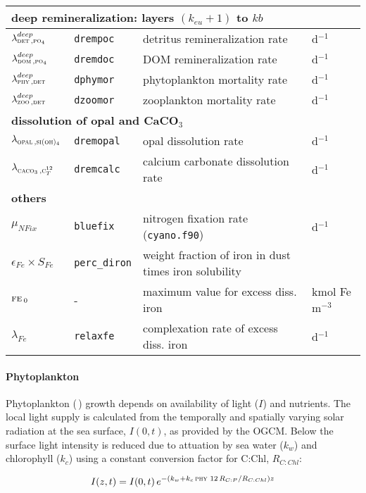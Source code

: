 \documentclass[11pt,a4paper,fleqn,twoside]{article}
\def\pho{\text{\textsc{po$_4$}}\,}
\def\car{\text{\textsc{c$_T^{12}$}}\,}
\def\sio{\text{\textsc{si(oh)$_4$}}\,}
\def\dom{\text{\textsc{dom}}\,}
\def\phy{\text{\textsc{phy}}\,}
\def\zoo{\text{\textsc{zoo}}\,}
\def\det{\text{\textsc{det}}\,}
\def\opal{\text{\textsc{opal}}\,}
\def\cal{\text{\textsc{caco$_3$}}\,}
\def\fe{\text{\textsc{fe}}\,}
\newcommand{\concFe}{kmol Fe m$^{-3}$\,}
\begin{document}
\begin{table}[htb]
\begin{center}
\begin{tabular}{llp{7cm}l}
\multicolumn{4}{l}{\rule{0mm}{4mm}\bf deep remineralization: layers $(k_{eu}+1)$
to $kb$}\\ \hline
$\lambda_{\det,\pho}^{deep}$&{\tt drempoc}& detritus remineralization rate& d$^{-1}$\\
$\lambda_{\dom,\pho}^{deep}$&{\tt dremdoc}& DOM remineralization rate& d$^{-1}$\\
$\lambda_{\phy,\det}^{deep}$&{\tt dphymor}& phytoplankton mortality rate& d$^{-1}$\\
$\lambda_{\zoo,\det}^{deep}$&{\tt dzoomor}& zooplankton mortality rate& d$^{-1}$\\
\multicolumn{4}{l}{\rule{0mm}{4mm}\bf dissolution of opal and CaCO$_3$}\\ \hline
$\lambda_{\opal,\sio}$ &{\tt dremopal}& opal dissolution rate& d$^{-1}$\\
$\lambda_{\cal,\car}$ &{\tt dremcalc}& calcium carbonate dissolution rate& d$^{-1}$\\ 
\multicolumn{4}{l}{\rule{0mm}{4mm}\bf others}\\ \hline
$\mu_{NFix}$&{\tt bluefix}& nitrogen fixation rate ({\tt cyano.f90})& d$^{-1}$\\
$\epsilon_{Fe}\times S_{Fe}$ &{\tt perc\_diron}& weight fraction of iron in dust times iron solubility & \\
$\fe_{0}$ & -  & maximum value for excess diss. iron & \concFe\\
$\lambda_{Fe}$ &{\tt relaxfe}& complexation rate of excess diss. iron &
d$^{-1}$\\ \hline
\end{tabular}
\end{center}
\renewcommand{\baselinestretch}{1.5}
\normalsize
\end{table}

\paragraph{Phytoplankton}  Phytoplankton (\phy)  growth
depends on availability of light ($I$) and nutrients. The local light supply is
calculated from the temporally and spatially varying solar radiation at the sea surface, $I(0,t)$, 
as provided by the OGCM.  Below the surface light intensity is reduced due to attuation 
by sea water ($k_w$) and chlorophyll ($k_c$) using a
constant conversion factor for C:Chl, $R_{C:Chl}$:

\begin{equation}
I(z,t) = I(0,t) \, e^{-(k_w+k_c\, \phy \, 12 \, R_{C:P} / R_{C:Chl}) z}  
\end{equation}
\end{document}
